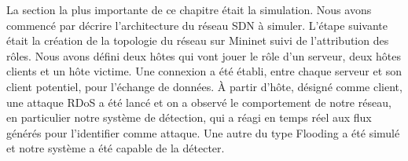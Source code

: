 La section la plus importante de ce chapitre était la simulation. Nous avons commencé par décrire l'architecture du réseau SDN à simuler. L'étape suivante était la création de la topologie du réseau sur Mininet suivi de l'attribution des rôles. Nous avons défini deux hôtes qui vont jouer le rôle d'un serveur, deux hôtes clients et un hôte victime. Une connexion a été établi, entre chaque serveur et son client potentiel, pour l'échange de données. À partir d'hôte, désigné comme client, une attaque RDoS a été lancé et on a observé le comportement de notre réseau, en particulier notre système de détection, qui a réagi en temps réel aux flux générés pour l'identifier comme attaque. Une autre du type Flooding a été simulé et notre système a été capable de la détecter.\\




 


